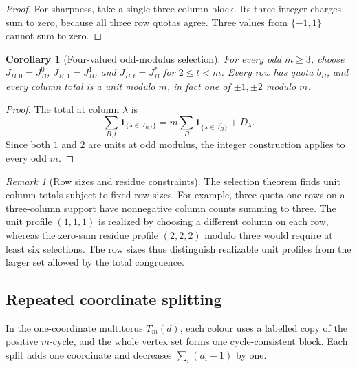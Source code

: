 \documentclass[11pt,reqno]{amsart}
\numberwithin{equation}{section}
\newtheorem{corollary}[theorem]{Corollary}
\theoremstyle{definition}
\theoremstyle{remark}
\newtheorem{remark}[theorem]{Remark}
\newcommand{\one}{\mathbf 1}
\begin{document}
\begin{proof}
For sharpness, take a single three-column block. Its three integer
charges sum to zero, because all three row quotas agree. Three values
from $\{-1,1\}$ cannot sum to zero.
\end{proof}

\begin{corollary}[Four-valued odd-modulus selection]\label{cor:odd-selector}
For every odd $m\ge3$, choose $J_{B,0}=J_B^0$, $J_{B,1}=J_B^1$, and
$J_{B,t}=J_B^*$ for $2\le t<m$. Every row has quota $b_B$, and every column
total is a unit modulo $m$, in fact one of $\pm1,\pm2$ modulo $m$.
\end{corollary}
\begin{proof}
The total at column $\lambda$ is
\begin{equation}\label{eq:integer-to-modular}
 \sum_{B,t}\one_{\{\lambda\in J_{B,t}\}}
 =m\sum_B\one_{\{\lambda\in J_B^*\}}+D_\lambda.
\end{equation}
Since both $1$ and $2$ are units at odd modulus, the integer
construction applies to every odd $m$.
\end{proof}

\begin{remark}[Row sizes and residue constraints]\label{rem:non-saturation}
The selection theorem finds unit column totals subject to fixed row
sizes. For example, three quota-one rows on a three-column support have
nonnegative column counts summing to three. The unit profile $(1,1,1)$
is realized by choosing a different column on each row, whereas the
zero-sum residue profile $(2,2,2)$ modulo three would require at least
six selections. The row sizes thus distinguish realizable unit profiles
from the larger set allowed by the total congruence.
\end{remark}

\subsection{Repeated coordinate splitting}\label{sec:direct}
In the one-coordinate multitorus $T_m(d)$, each colour uses a labelled
copy of the positive $m$-cycle, and the whole vertex set forms one
cycle-consistent block. Each split adds one coordinate and decreases
$\sum_i(a_i-1)$ by one.
\end{document}
